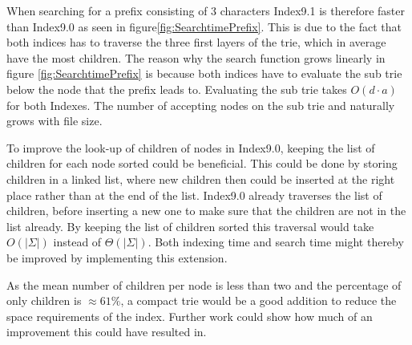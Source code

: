 When searching for a prefix consisting of 3 characters Index9.1 is therefore faster than Index9.0 as seen in figure\ref{fig:SearchtimePrefix}. This is due to the fact that both indices has to traverse the three first layers of the trie, which in average have the most children. The reason why the search function grows linearly in figure \ref{fig:SearchtimePrefix} is because both indices have to evaluate the sub trie below the node that the prefix leads to. Evaluating the sub trie takes $O(d\cdot a)$ for both Indexes. The number of accepting nodes on the sub trie and naturally grows with file size. 

To improve the look-up of children of nodes in Index9.0, keeping the list of children for each node sorted could be beneficial. This could be done by storing children in a linked list, where new children then could be inserted at the right place rather than at the end of the list. Index9.0 already traverses the list of children, before inserting a new one to make sure that the children are not in the list already. By keeping the list of children sorted this traversal would take $O(|\Sigma|)$ instead of $\Theta(|\Sigma|)$. Both indexing time and search time might thereby be improved by implementing this extension.

As the mean number of children per node is less than two and the percentage of only children is $\approx 61\%$, a compact trie would be a good addition to reduce the space requirements of the index. Further work could show how much of an improvement this could have resulted in. 
